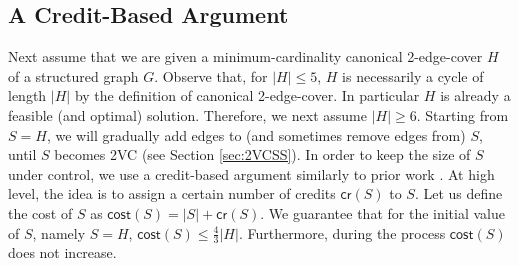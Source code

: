 \documentclass{theoretics}
\newcommand{\cost}{\mathsf{cost}}
\newcommand{\credit}{\mathsf{cr}}
\begin{document}
\subsection{A Credit-Based Argument}
\label{sec:overview:credits}

Next assume that we are given a minimum-cardinality canonical 2-edge-cover $H$ of a structured graph $G$. Observe that, for $|H|\leq 5$, $H$ is necessarily a cycle of length $|H|$ by the definition of canonical 2-edge-cover. In particular $H$ is already a feasible (and optimal) solution. Therefore, we next assume $|H|\geq 6$. Starting from $S=H$, we will gradually add edges to (and sometimes remove edges from) $S$, until $S$ becomes 2VC (see Section \ref{sec:2VCSS}). In order to keep the size of $S$ under control, we use a credit-based argument similarly to prior work \cite{CDGKN20,GGJ23,GJT22}. At high level, the idea is to assign a certain number of credits $\credit(S)$ to $S$. Let us define the cost of $S$ as $\cost(S)=|S|+\credit(S)$. We guarantee that for the initial value of $S$, namely $S=H$, $\cost(S)\leq \frac{4}{3}|H|$. Furthermore, during the process $\cost(S)$ does not increase. 
\end{document}
